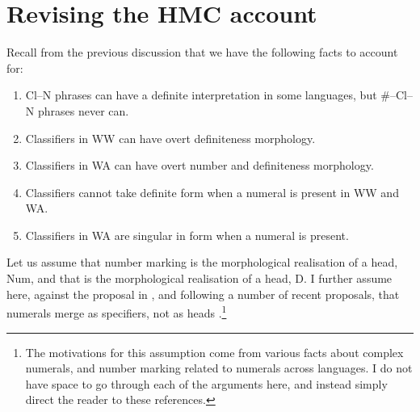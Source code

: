 \documentclass[output=paper
,modfonts
,nonflat]{langsci/langscibook}
\begin{document}
\section{Revising the HMC account}

Recall from the previous discussion that we have the following facts to account for:

\begin{enumerate}
\item Cl--N phrases can have a definite interpretation in some languages, but \#--Cl--N phrases never can.
\item Classifiers in WW can have overt definiteness morphology.
\item Classifiers in WA can have overt number and definiteness morphology.
\item Classifiers cannot take definite form when a numeral is present in WW and WA.
\item Classifiers in WA are singular in form when a numeral is present.
\end{enumerate}

Let us assume that number marking is the morphological realisation of a head, Num, and that  is the morphological realisation of a head, D. I further assume here, against the proposal in \citet{Simpson2005}, and following a number of recent proposals, that numerals merge as specifiers, not as heads \citep{Cinque2005,Borer2005,Ionin2006,Ouwayda2014}.\footnote{The motivations for this assumption come from various facts about complex numerals, and number marking related to numerals across languages. I do not have space to go through each of the arguments here, and instead simply direct the reader to these references.}  
\end{document}
